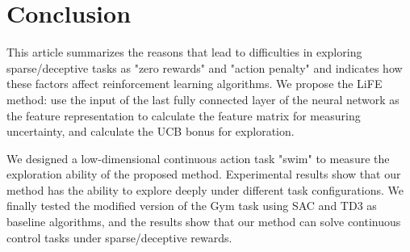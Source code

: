 \section{Conclusion}
This article summarizes the reasons that lead to difficulties in exploring sparse/deceptive tasks as "zero rewards" and "action penalty" and indicates how these factors affect reinforcement learning algorithms. We propose the LiFE method: use the input of the last fully connected layer of the neural network as the feature representation to calculate the feature matrix for measuring uncertainty, and calculate the UCB bonus for exploration. 

We designed a low-dimensional continuous action task "swim" to measure the exploration ability of the proposed method. Experimental results show that our method has the ability to explore deeply under different task configurations. We finally tested the modified version of the Gym task using SAC and TD3 as baseline algorithms, and the results show that our method can solve continuous control tasks under sparse/deceptive rewards.